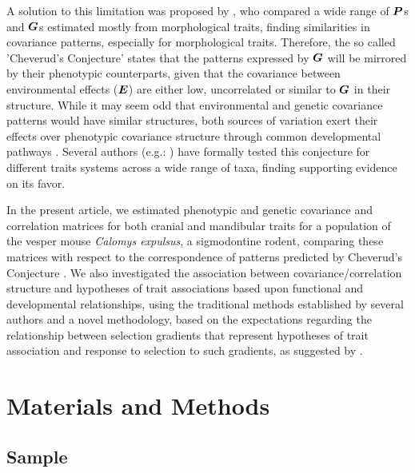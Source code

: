 \documentclass [twocolumn, natbib, nospthms, 10pt] {svjour3}
\begin{document}
A solution to this limitation was proposed by
\citet{cheverud_comparison_1988}, who compared a wide range of
$\boldsymbol{P}$s and $\boldsymbol{G}$s estimated mostly from morphological traits,
finding similarities in covariance patterns, especially for
morphological traits. Therefore, the so called 'Cheverud's Conjecture'
\citep{roff_estimation_1995} states that the patterns expressed by
$\boldsymbol{G}$ will be mirrored by their phenotypic counterparts, given that
the covariance between environmental effects ($\boldsymbol{E}$) are either
low, uncorrelated or similar to $\boldsymbol{G}$ in their structure. While it
may seem odd that environmental and genetic covariance patterns would
have similar structures, both sources of variation exert their effects
over phenotypic covariance structure through common developmental
pathways \citep{klingenberg_morphological_2008}.  Several authors
(e.g.: \citealp{roff_estimation_1995, roff_evolutionary_1997,
  reusch_quantitative_1998, roff_path_2011, dochtermann_testing_2011})
have formally tested this conjecture for different traits systems
across a wide range of taxa, finding supporting evidence on its favor.

In the present article, we estimated phenotypic and genetic covariance
and correlation matrices for both cranial and mandibular traits for a
population of the vesper mouse \emph{Calomys expulsus}, a sigmodontine
rodent, comparing these matrices with respect to the correspondence of
patterns predicted by Cheverud's Conjecture
\citep{cheverud_comparison_1988, roff_estimation_1995}. We also
investigated the association between covariance/correlation structure
and hypotheses of trait associations based upon functional and
developmental relationships, using the traditional methods established
by several authors \citep{cheverud_morphological_1995,
  marroig_comparison_2001, marroig_cranial_2004, porto_evolution_2009}
and a novel methodology, based on the expectations regarding the
relationship between selection gradients that represent hypotheses of
trait association and response to selection to such gradients, as
suggested by \citet{hansen_measuring_2008}.

\section {Materials and Methods}

\label {mms}

\subsection{Sample}
\label {mms:samp}
\end{document}
